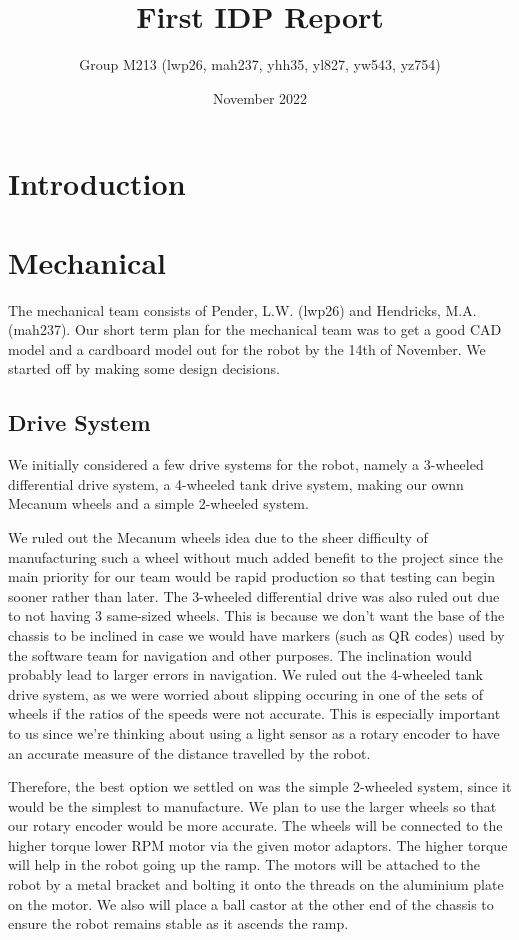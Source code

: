 \documentclass{article}
\title{First IDP Report}
\author{Group M213 (lwp26, mah237, yhh35, yl827, yw543, yz754)}
\date{November 2022}
\begin{document}
\maketitle

\section{Introduction}
    
\section{Mechanical}
\quad The mechanical team consists of Pender, L.W. (lwp26) and Hendricks, M.A.(mah237). Our short term plan for the mechanical team was to get a good CAD model and a cardboard model out for the robot by the 14th of November. We started off by making some design decisions.

\subsection{Drive System}
\quad \quad We initially considered a few drive systems for the robot, namely a 3-wheeled differential drive system, a 4-wheeled tank drive system, making our ownn Mecanum wheels and a simple 2-wheeled system. 

\quad We ruled out the Mecanum wheels idea due to the sheer difficulty of manufacturing such a wheel without much added benefit to the project since the main priority for our team would be rapid production so that testing can begin sooner rather than later. The 3-wheeled differential drive was also ruled out due to not having 3 same-sized wheels. This is because we don't want the base of the chassis to be inclined in case we would have markers (such as QR codes) used by the software team for navigation and other purposes. The inclination would probably lead to larger errors in navigation. We ruled out the 4-wheeled tank drive system, as we were worried about slipping occuring in one of the sets of wheels if the ratios of the speeds were not accurate. This is especially important to us since we're thinking about using a light sensor as a rotary encoder to have an accurate measure of the distance travelled by the robot.

\quad Therefore, the best option we settled on was the simple 2-wheeled system, since it would be the simplest to manufacture. We plan to use the larger wheels so that our rotary encoder would be more accurate. The wheels will be connected to the higher torque lower RPM motor via the given motor adaptors. The higher torque will help in the robot going up the ramp. The motors will be attached to the robot by a metal bracket and bolting it onto the threads on the aluminium plate on the motor. We also will place a ball castor at the other end of the chassis to ensure the robot remains stable as it ascends the ramp.
\end{document}
